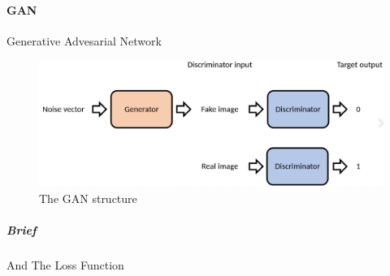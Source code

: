 \paragraph{GAN}

Generative Advesarial Network \cite{goodfellowGenerativeAdversarialNetworks2014}

\begin{figure}
    \centering
    \includegraphics[width=\linewidth]{fig_gan_wiki.png}
    \caption{The GAN structure}
\end{figure}

\subparagraph{Brief}


And The Loss Function




